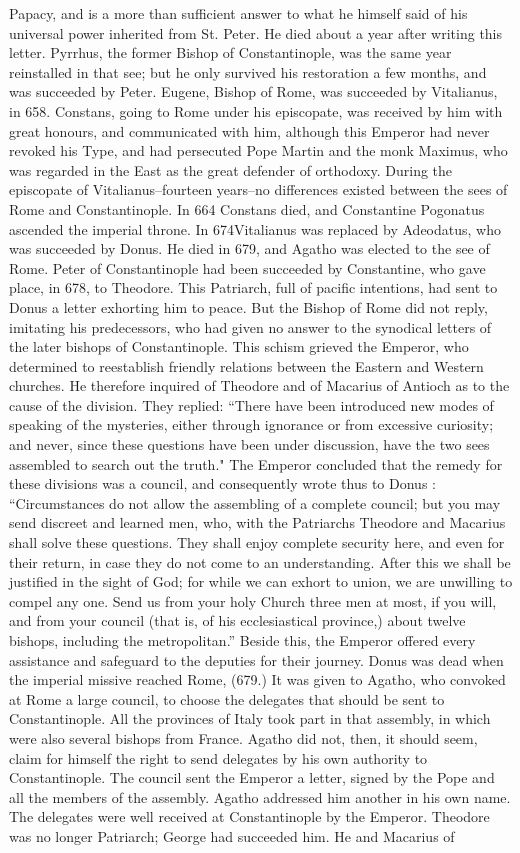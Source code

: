 Papacy, and is a more than sufficient answer to what he himself said of his universal power inherited from St. Peter. He died about a year after writing this letter. Pyrrhus, the former Bishop of Constantinople, was the same year reinstalled in that see; but he only survived his restoration a few months, and was succeeded by Peter. Eugene, Bishop of Rome, was succeeded by Vitalianus, in 658. Constans, going to Rome under his episcopate, was received by him with great honours, and communicated with him, although this Emperor had never revoked his Type, and had persecuted Pope Martin and the monk Maximus, who was regarded in the East as the great defender of orthodoxy. During the episcopate of Vitalianus--fourteen years--no differences existed between the sees of Rome and Constantinople. In 664 Constans died, and Constantine Pogonatus ascended the imperial throne. In 674Vitalianus was replaced by Adeodatus, who was succeeded by Donus. He died in 679, and Agatho was elected to the see of Rome. Peter of Constantinople had been succeeded by Constantine, who gave place, in 678, to Theodore. This Patriarch, full of pacific intentions, had sent to Donus a letter exhorting him to peace. But the Bishop of Rome did not reply, imitating his predecessors, who had given no answer to the synodical letters of the later bishops of Constantinople. This schism grieved the Emperor, who determined to reestablish friendly relations between the Eastern and Western churches. He therefore inquired of Theodore and of Macarius of Antioch as to the cause of the division. They replied: “There have been introduced new modes of speaking of the mysteries, either through ignorance or from excessive curiosity; and never, since these questions have been under discussion, have the two sees assembled to search out the truth." The Emperor concluded that the remedy for these divisions was a council, and consequently wrote thus to Donus : “Circumstances do not allow the assembling of a complete council; but you may send discreet and learned men, who, with the Patriarchs Theodore and Macarius shall solve these questions. They shall enjoy complete security here, and even for their return, in case they do not come to an understanding. After this we shall be justified in the sight of God; for while we can exhort to union, we are unwilling to compel any one. Send us from your holy Church three men at most, if you will, and from your council (that is, of his ecclesiastical province,) about twelve bishops, including the metropolitan.” Beside this, the Emperor offered every assistance and safeguard to the deputies for their journey. Donus was dead when the imperial missive reached Rome, (679.) It was given to Agatho, who convoked at Rome a large council, to choose the delegates that should be sent to Constantinople. All the provinces of Italy took part in that assembly, in which were also several bishops from France. Agatho did not, then, it should seem, claim for himself the right to send delegates by his own authority to Constantinople. The council sent the Emperor a letter, signed by the Pope and all the members of the assembly. Agatho addressed him another in his own name. The delegates were well received at Constantinople by the Emperor. Theodore was no longer Patriarch; George had succeeded him. He and Macarius of 